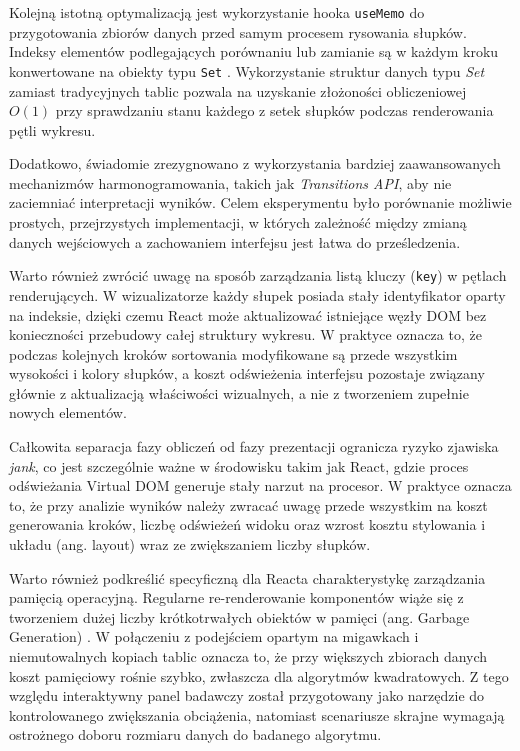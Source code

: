 \documentclass[12pt,openright,twoside]{report}
\begin{document}
Kolejną istotną optymalizacją jest wykorzystanie hooka \texttt{useMemo} do przygotowania zbiorów danych przed samym procesem rysowania słupków. Indeksy elementów podlegających porównaniu lub zamianie są w każdym kroku konwertowane na obiekty typu \texttt{Set} \cite{React_Official}. Wykorzystanie struktur danych typu \textit{Set} zamiast tradycyjnych tablic pozwala na uzyskanie złożoności obliczeniowej $O(1)$ przy sprawdzaniu stanu każdego z setek słupków podczas renderowania pętli wykresu.

Dodatkowo, świadomie zrezygnowano z wykorzystania bardziej zaawansowanych mechanizmów harmonogramowania, takich jak \textit{Transitions API}, aby nie zaciemniać interpretacji wyników. Celem eksperymentu było porównanie możliwie prostych, przejrzystych implementacji, w których zależność między zmianą danych wejściowych a zachowaniem interfejsu jest łatwa do prześledzenia.

Warto również zwrócić uwagę na sposób zarządzania listą kluczy (\texttt{key}) w pętlach renderujących. W wizualizatorze każdy słupek posiada stały identyfikator oparty na indeksie, dzięki czemu React może aktualizować istniejące węzły DOM bez konieczności przebudowy całej struktury wykresu. W praktyce oznacza to, że podczas kolejnych kroków sortowania modyfikowane są przede wszystkim wysokości i kolory słupków, a koszt odświeżenia interfejsu pozostaje związany głównie z aktualizacją właściwości wizualnych, a nie z tworzeniem zupełnie nowych elementów.

Całkowita separacja fazy obliczeń od fazy prezentacji ogranicza ryzyko zjawiska \textit{jank}, co jest szczególnie ważne w środowisku takim jak React, gdzie proces odświeżania Virtual DOM generuje stały narzut na procesor. W praktyce oznacza to, że przy analizie wyników należy zwracać uwagę przede wszystkim na koszt generowania kroków, liczbę odświeżeń widoku oraz wzrost kosztu stylowania i układu (ang. layout) wraz ze zwiększaniem liczby słupków.

Warto również podkreślić specyficzną dla Reacta charakterystykę zarządzania pamięcią operacyjną. Regularne re-renderowanie komponentów wiąże się z tworzeniem dużej liczby krótkotrwałych obiektów w pamięci (ang. Garbage Generation) \cite{High_Perf_JS}. W połączeniu z podejściem opartym na migawkach i niemutowalnych kopiach tablic oznacza to, że przy większych zbiorach danych koszt pamięciowy rośnie szybko, zwłaszcza dla algorytmów kwadratowych. Z tego względu interaktywny panel badawczy został przygotowany jako narzędzie do kontrolowanego zwiększania obciążenia, natomiast scenariusze skrajne wymagają ostrożnego doboru rozmiaru danych do badanego algorytmu.
\end{document}
